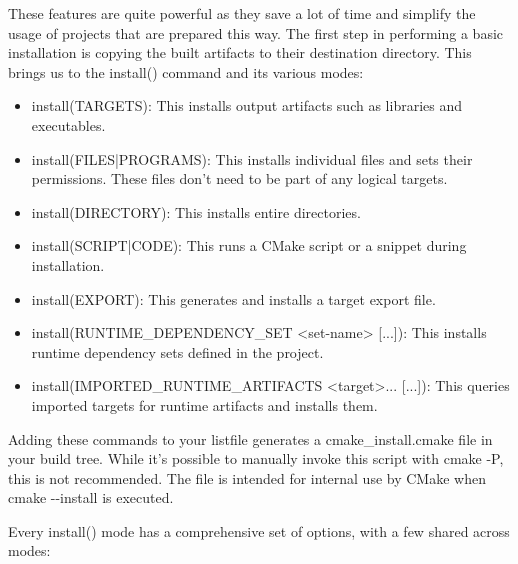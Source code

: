 These features are quite powerful as they save a lot of time and simplify the usage of projects that are prepared this way. The first step in performing a basic installation is copying the built artifacts to their destination directory. This brings us to the install() command and its various modes:

\begin{itemize}
\item
install(TARGETS): This installs output artifacts such as libraries and executables.

\item
install(FILES|PROGRAMS): This installs individual files and sets their permissions. These files don’t need to be part of any logical targets.

\item
install(DIRECTORY): This installs entire directories.

\item
install(SCRIPT|CODE): This runs a CMake script or a snippet during installation.

\item
install(EXPORT): This generates and installs a target export file.

\item
install(RUNTIME\_DEPENDENCY\_SET <set-name> [...]): This installs runtime dependency sets defined in the project.

\item
install(IMPORTED\_RUNTIME\_ARTIFACTS <target>... [...]): This queries imported targets for runtime artifacts and installs them.
\end{itemize}

Adding these commands to your listfile generates a cmake\_install.cmake file in your build tree. While it’s possible to manually invoke this script with cmake -P, this is not recommended. The file is intended for internal use by CMake when cmake -{}-install is executed.

Every install() mode has a comprehensive set of options, with a few shared across modes:

